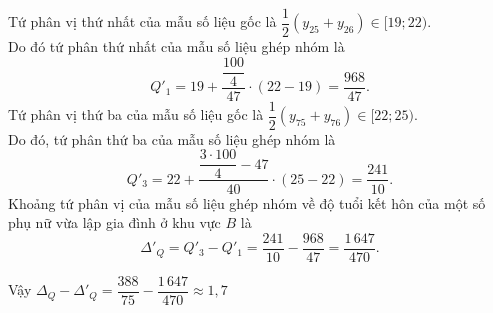 \begin{ex}
{\begin{itemize}
			Tứ phân vị thứ nhất của mẫu số liệu gốc là $\dfrac{1}{2}(y_{25}+y_{26})\in [19;22)$.\\
			Do đó tứ phân thứ nhất của mẫu số liệu ghép nhóm là
			$$Q'_1=19+\dfrac{\dfrac{100}{4}}{47}\cdot (22-19)=\dfrac{968}{47}.$$
			Tứ phân vị thứ ba của mẫu số liệu gốc là $\dfrac{1}{2}(y_{75}+y_{76})\in [22;25)$.\\
			Do đó, tứ phân thứ ba của mẫu số liệu ghép nhóm là
			$$Q'_3=22+\dfrac{\dfrac{3\cdot 100}{4}-47}{40}\cdot (25-22)=\dfrac{241}{10}.$$
			Khoảng tứ phân vị của mẫu số liệu ghép nhóm về độ tuổi kết hôn của một số phụ nữ vừa lập gia đình ở khu vực $B$ là
			$$\Delta'_Q=Q'_3-Q'_1=\dfrac{241}{10}-\dfrac{968}{47}=\dfrac{1\,647}{470}.$$
		\end{itemize}
		Vậy $\Delta_Q-\Delta'_Q=\dfrac{388}{75}-\dfrac{1\,647}{470}\approx 1{,}7$
	}
\end{ex}

